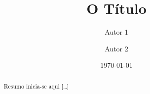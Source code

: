 \documentclass{article}
\title{O Título}
\author{Autor 1 \and Autor 2}
\date{\today}
\begin{document}
\maketitle

\begin{abstract}
Resumo inicia-se aqui [\ldots]
\end{abstract}
            
\end{document}
